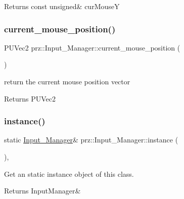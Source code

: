 \begin{DoxyReturn}{Returns}
const unsigned\& cur\+MouseY 
\end{DoxyReturn}
\mbox{\label{classprz_1_1_input___manager_a05861231ed2b0b64154579cd3eced94a}} 
\subsubsection{\texorpdfstring{current\_mouse\_position()}{current\_mouse\_position()}}
{\footnotesize\ttfamily P\+U\+Vec2 prz\+::\+Input\+\_\+\+Manager\+::current\+\_\+mouse\+\_\+position (\begin{DoxyParamCaption}{ }\end{DoxyParamCaption})\hspace{0.3cm}{\ttfamily [inline]}}



return the current mouse position vector 

\begin{DoxyReturn}{Returns}
P\+U\+Vec2 
\end{DoxyReturn}
\mbox{\label{classprz_1_1_input___manager_a6bc910b69659d7ea1288ed5758bfe9e5}} 
\subsubsection{\texorpdfstring{instance()}{instance()}}
{\footnotesize\ttfamily static \mbox{\hyperlink{classprz_1_1_input___manager}{Input\+\_\+\+Manager}}\& prz\+::\+Input\+\_\+\+Manager\+::instance (\begin{DoxyParamCaption}{ }\end{DoxyParamCaption})\hspace{0.3cm}{\ttfamily [inline]}, {\ttfamily [static]}}



Get an static instance object of this class. 

\begin{DoxyReturn}{Returns}
Input\+Manager\& 
\end{DoxyReturn}
\mbox{\label{classprz_1_1_input___manager_abaf16456e62dd4a4ab1fc7115f0a4988}} 
